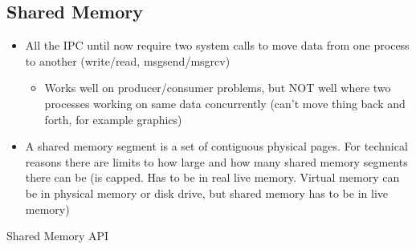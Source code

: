 \subsection{Shared Memory}
\begin{itemize}
    \item All the IPC until now require two system calls to move data from one process to another (write/read, msgsend/msgrcv)
    \begin{itemize}
        \item Works well on producer/consumer problems, but NOT well where two processes working on same data concurrently (can't move thing back and forth, for example graphics)
    \end{itemize}
    \item A shared memory segment is a set of contiguous physical pages. For technical reasons there are limits to how large and how many shared memory segments there can be (is capped. Has to be in real live memory. Virtual memory can be in physical memory or disk drive, but shared memory has to be in live memory)
\end{itemize}
Shared Memory API

